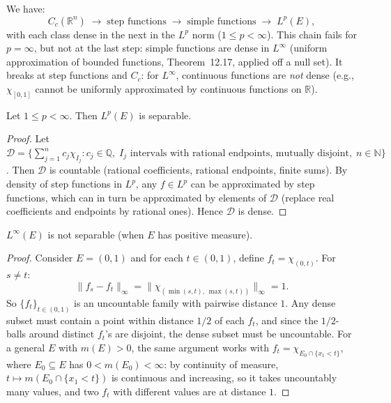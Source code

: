 \documentclass[11pt]{report}
\begin{document}
\begin{rembox}
We have:
\[
C_c(\mathbb{R}^n) \;\longrightarrow\; \text{step functions} \;\longrightarrow\; \text{simple functions} \;\longrightarrow\; L^p(E),
\]
with each class dense in the next in the $L^p$ norm ($1 \leq p < \infty$). This chain fails for $p = \infty$, but not at the last step: simple functions are dense in $L^\infty$ (uniform approximation of bounded functions, Theorem~12.17, applied off a null set). It breaks at step functions and $C_c$: for $L^\infty$, continuous functions are \textit{not} dense (e.g., $\chi_{[0,1]}$ cannot be uniformly approximated by continuous functions on $\mathbb{R}$).
\end{rembox}

\begin{corbox}
Let $1 \leq p < \infty$. Then $L^p(E)$ is separable.
\end{corbox}

\begin{proof}
Let $\mathcal{D} = \{\sum_{j=1}^{n} c_j \chi_{I_j} : c_j \in \mathbb{Q},\; I_j \text{ intervals with rational endpoints, mutually disjoint}, \; n \in \mathbb{N}\}$. Then $\mathcal{D}$ is countable (rational coefficients, rational endpoints, finite sums). By density of step functions in $L^p$, any $f \in L^p$ can be approximated by step functions, which can in turn be approximated by elements of $\mathcal{D}$ (replace real coefficients and endpoints by rational ones). Hence $\mathcal{D}$ is dense.
\end{proof}

\begin{thmbox}
$L^\infty(E)$ is not separable (when $E$ has positive measure).
\end{thmbox}

\begin{proof}
Consider $E = (0, 1)$ and for each $t \in (0, 1)$, define $f_t = \chi_{(0, t)}$. For $s \neq t$:
\[
\|f_s - f_t\|_\infty = \|\chi_{(\min(s,t),\, \max(s,t))}\|_\infty = 1.
\]
So $\{f_t\}_{t \in (0,1)}$ is an uncountable family with pairwise distance $1$. Any dense subset must contain a point within distance $1/2$ of each $f_t$, and since the $1/2$-balls around distinct $f_t$'s are disjoint, the dense subset must be uncountable. For a general $E$ with $m(E) > 0$, the same argument works with $f_t = \chi_{E_0 \cap \{x_1 < t\}}$, where $E_0 \subseteq E$ has $0 < m(E_0) < \infty$: by continuity of measure, $t \mapsto m(E_0 \cap \{x_1 < t\})$ is continuous and increasing, so it takes uncountably many values, and two $f_t$ with different values are at distance $1$.
\end{proof}
\end{document}
